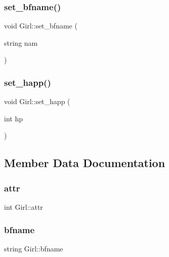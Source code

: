 \subsubsection{\texorpdfstring{set\+\_\+bfname()}{set\_bfname()}}
{\footnotesize\ttfamily void Girl\+::set\+\_\+bfname (\begin{DoxyParamCaption}\item[{string}]{nam }\end{DoxyParamCaption})}

\mbox{\label{classGirl_a6caadce0d6d58861f14bc49085629380}} 
\subsubsection{\texorpdfstring{set\+\_\+happ()}{set\_happ()}}
{\footnotesize\ttfamily void Girl\+::set\+\_\+happ (\begin{DoxyParamCaption}\item[{int}]{hp }\end{DoxyParamCaption})}



\subsection{Member Data Documentation}
\mbox{\label{classGirl_a136078d5111d5dc1fef6a35f84b38c01}} 
\subsubsection{\texorpdfstring{attr}{attr}}
{\footnotesize\ttfamily int Girl\+::attr\hspace{0.3cm}{\ttfamily [private]}}

\mbox{\label{classGirl_a9879d5b627e9f64ea139673c0c48e726}} 
\subsubsection{\texorpdfstring{bfname}{bfname}}
{\footnotesize\ttfamily string Girl\+::bfname\hspace{0.3cm}{\ttfamily [private]}}

\mbox{\label{classGirl_a2ee18ed2f7e67fad894784f366479897}} 
